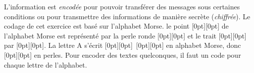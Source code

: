 \documentclass[a4paper,11pt]{report}
\newcommand{\taskGraphicsFolder}{..}
\begin{document}
L’information est \emph{encodée} pour pouvoir transférer des messages sous certaines conditions ou pour transmettre des informations de manière secrète (\emph{chiffrée}). Le codage de cet exercice est basé sur l’alphabet Morse. le point \raisebox{\dimexpr -0.5ex +0.7ex \relax}[0pt][0pt]{} de l’alphabet Morse est représenté par la perle ronde \raisebox{-0.5ex}[0pt][0pt]{} et le trait \raisebox{\dimexpr -0.5ex +0.7ex \relax}[0pt][0pt]{} par \raisebox{-0.5ex}[0pt][0pt]{}. La lettre A s’écrit \raisebox{\dimexpr -0.5ex +0.7ex \relax}[0pt][0pt]{}~\raisebox{\dimexpr -0.5ex +0.7ex \relax}[0pt][0pt]{} en alphabet Morse, donc \raisebox{-0.5ex}[0pt][0pt]{} en perles. Pour encoder des textes quelconques, il faut un code pour chaque lettre de l’alphabet.
\end{document}
